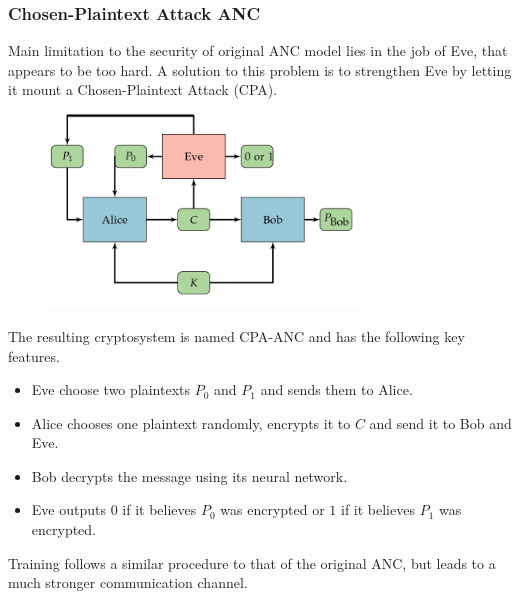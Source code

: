 \documentclass{beamer}
\begin{document}
\begin{frame}
\frametitle{Chosen-Plaintext Attack ANC}
Main limitation to the security of original ANC model lies in the job of Eve, that appears to be too hard. A solution to this problem is to strengthen Eve by letting it mount a Chosen-Plaintext Attack (CPA).
\begin{figure}
\includegraphics[width = 0.75\textwidth]{"pictures/cpa-anc.png"}
\end{figure}
\end{frame}
\begin{frame}
The resulting cryptosystem is named CPA-ANC and has the following key features.
\begin{itemize}
\item Eve choose two plaintexts $P_0$ and $P_1$ and sends them to Alice. 
\item Alice chooses one plaintext randomly, encrypts it to $C$ and send it to Bob and Eve.
\item Bob decrypts the message using its neural network.
\item Eve outputs $0$ if it believes $P_0$ was encrypted or $1$ if it believes $P_1$ was encrypted.
\end{itemize}
Training follows a similar procedure to that of the original ANC, but leads to a much stronger communication channel.
\end{frame}
\end{document}
